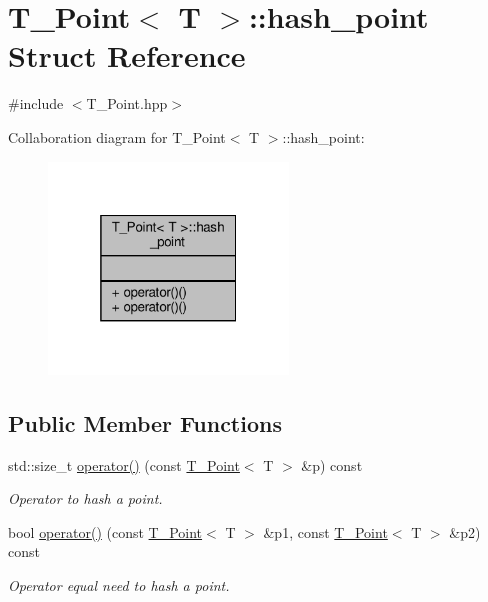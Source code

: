 \hypertarget{structT__Point_1_1hash__point}{}\section{T\+\_\+\+Point$<$ T $>$\+:\+:hash\+\_\+point Struct Reference}
\label{structT__Point_1_1hash__point}


{\ttfamily \#include $<$T\+\_\+\+Point.\+hpp$>$}



Collaboration diagram for T\+\_\+\+Point$<$ T $>$\+:\+:hash\+\_\+point\+:
\nopagebreak
\begin{figure}[H]
\begin{center}
\leavevmode
\includegraphics[width=181pt]{structT__Point_1_1hash__point__coll__graph}
\end{center}
\end{figure}
\subsection*{Public Member Functions}
\begin{DoxyCompactItemize}
\item 
std\+::size\+\_\+t \hyperlink{structT__Point_1_1hash__point_a6d41490eb7af074b029db524a80e2e53}{operator()} (const \hyperlink{classT__Point}{T\+\_\+\+Point}$<$ T $>$ \&p) const
\begin{DoxyCompactList}\small\item\em Operator to hash a point. \end{DoxyCompactList}\item 
bool \hyperlink{structT__Point_1_1hash__point_a92f4c83c6538fcb66804d44e944d7b20}{operator()} (const \hyperlink{classT__Point}{T\+\_\+\+Point}$<$ T $>$ \&p1, const \hyperlink{classT__Point}{T\+\_\+\+Point}$<$ T $>$ \&p2) const
\begin{DoxyCompactList}\small\item\em Operator equal need to hash a point. \end{DoxyCompactList}\end{DoxyCompactItemize}


